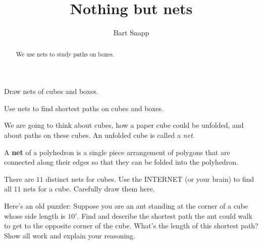 \documentclass[noauthor,nooutcomes,hints,handout,12pt]{ximera}
\title{Nothing but nets}
\author{Bart Snapp}
\begin{document}
\begin{abstract}
  We use nets to study paths on boxes.
\end{abstract}
\maketitle

\begin{listOutcomes}
\item Draw nets of cubes and boxes.
\item Use nets to find shortest paths on cubes and boxes.
\end{listOutcomes}



We are going to think about cubes, how a paper cube could be unfolded, and about paths on these cubes. An unfolded cube is called a \textit{net}.


\begin{definition}
  A \textbf{net} of a polyhedron is a
  single piece arrangement of polygons that are connected along their
  edges so that they can be folded into the polyhedron.
\end{definition}


\mynewpage


\begin{question}
  There are $11$ distinct nets for cubes. Use the INTERNET (or your
  brain) to find all $11$ nets for a cube. Carefully draw them here.
  
\end{question}
\mynewpage

\begin{question}
  Here's an old puzzler: Suppose you are an ant standing at the corner
  of a cube whose side length is $10'$. Find and describe the shortest
  path the ant could walk to get to the opposite corner of the cube. What's the
  length of this shortest path? Show all work and explain your reasoning.
\end{question}
\mynewpage
\end{document}

